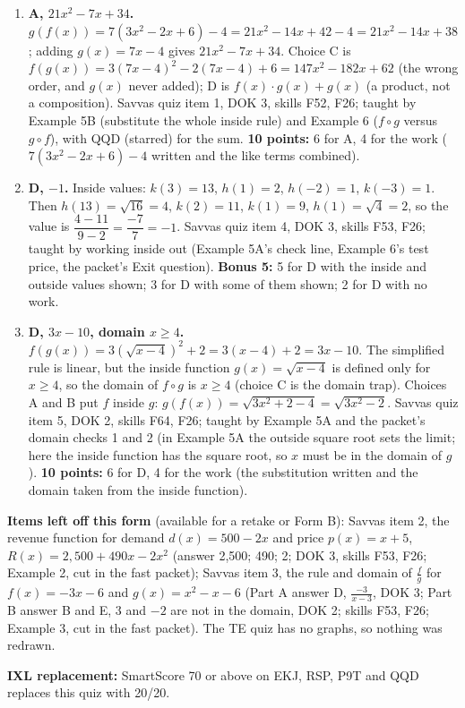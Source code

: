\documentclass[11pt]{article}
\begin{document}
\begin{enumerate}
\item[\textbf{1.}] \textbf{A, $21x^2-7x+34$.} $g(f(x))=7(3x^2-2x+6)-4=21x^2-14x+42-4=21x^2-14x+38$; adding $g(x)=7x-4$ gives $21x^2-7x+34$. Choice C is $f(g(x))=3(7x-4)^2-2(7x-4)+6=147x^2-182x+62$ (the wrong order, and $g(x)$ never added); D is $f(x)\cdot g(x)+g(x)$ (a product, not a composition). Savvas quiz item 1, DOK 3, skills F52, F26; taught by Example 5B (substitute the whole inside rule) and Example 6 ($f\circ g$ versus $g\circ f$), with QQD (starred) for the sum. \textbf{10 points:} 6 for A, 4 for the work ($7(3x^2-2x+6)-4$ written and the like terms combined).
\item[\textbf{4.}] \textbf{D, $-1$.} Inside values: $k(3)=13$, $h(1)=2$, $h(-2)=1$, $k(-3)=1$. Then $h(13)=\sqrt{16}=4$, $k(2)=11$, $k(1)=9$, $h(1)=\sqrt4=2$, so the value is $\dfrac{4-11}{9-2}=\dfrac{-7}{7}=-1$. Savvas quiz item 4, DOK 3, skills F53, F26; taught by working inside out (Example 5A's check line, Example 6's test price, the packet's Exit question). \textbf{Bonus 5:} 5 for D with the inside and outside values shown; 3 for D with some of them shown; 2 for D with no work.
\item[\textbf{5.}] \textbf{D, $3x-10$, domain $x\geq4$.} $f(g(x))=3\left(\sqrt{x-4}\right)^2+2=3(x-4)+2=3x-10$. The simplified rule is linear, but the inside function $g(x)=\sqrt{x-4}$ is defined only for $x\geq4$, so the domain of $f\circ g$ is $x\geq4$ (choice C is the domain trap). Choices A and B put $f$ inside $g$: $g(f(x))=\sqrt{3x^2+2-4}=\sqrt{3x^2-2}$. Savvas quiz item 5, DOK 2, skills F64, F26; taught by Example 5A and the packet's domain checks 1 and 2 (in Example 5A the outside square root sets the limit; here the inside function has the square root, so $x$ must be in the domain of $g$). \textbf{10 points:} 6 for D, 4 for the work (the substitution written and the domain taken from the inside function).
\end{enumerate}

\textbf{Items left off this form} (available for a retake or Form B): Savvas item 2, the revenue function for demand $d(x)=500-2x$ and price $p(x)=x+5$, $R(x)=2{,}500+490x-2x^2$ (answer 2,500; 490; 2; DOK 3, skills F53, F26; Example 2, cut in the fast packet); Savvas item 3, the rule and domain of $\frac fg$ for $f(x)=-3x-6$ and $g(x)=x^2-x-6$ (Part A answer D, $\frac{-3}{x-3}$, DOK 3; Part B answer B and E, $3$ and $-2$ are not in the domain, DOK 2; skills F53, F26; Example 3, cut in the fast packet). The TE quiz has no graphs, so nothing was redrawn.

\textbf{IXL replacement:} SmartScore 70 or above on EKJ, RSP, P9T and QQD replaces this quiz with 20/20.
\end{document}
